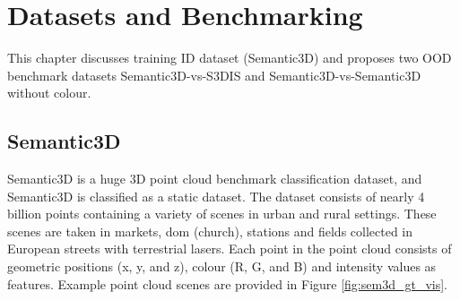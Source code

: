 

    \chapter{Datasets and Benchmarking}
    \label{ch:benchmark}
    This chapter discusses training ID dataset (Semantic3D) and proposes two OOD benchmark datasets Semantic3D-vs-S3DIS and Semantic3D-vs-Semantic3D without colour.
    \section{Semantic3D}
    \label{sec:dataset_sem3d}
    Semantic3D is a huge 3D  point cloud benchmark classification dataset, and Semantic3D is classified as a static dataset.
    The dataset consists of nearly 4 billion points containing a variety of scenes in urban and rural settings.
    These scenes are taken in markets, dom (church), stations and fields collected in European streets with terrestrial lasers.
    Each point in the point cloud consists of geometric positions (x, y, and z), colour (R, G, and B) and intensity values as features.
    Example point cloud scenes are provided in Figure \ref{fig:sem3d_gt_vis}. 
    
